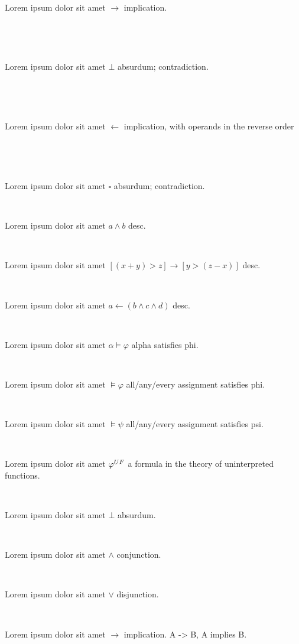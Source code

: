 \documentclass[12pt]{article}
\begin{document}
\centerline{~}

Lorem ipsum dolor sit amet $ \rightarrow $ implication.

\centerline{~}

\centerline{~}

Lorem ipsum dolor sit amet $ \bot $ absurdum; contradiction.

\centerline{~}

\centerline{~}

Lorem ipsum dolor sit amet $ \leftarrow  $ implication, with operands in the reverse order

\centerline{~}

\centerline{~}

Lorem ipsum dolor sit amet $ \square $ absurdum; contradiction.

\centerline{~}


Lorem ipsum dolor sit amet $ a \wedge b $ desc.

\centerline{~}


Lorem ipsum dolor sit amet $ [ ( x + y ) > z ] \rightarrow [ y > ( z - x ) ] $ desc.

\centerline{~}


Lorem ipsum dolor sit amet $ a \leftarrow ( b \wedge c \wedge d )  $ desc.

\centerline{~}

Lorem ipsum dolor sit amet $ \alpha \vDash \varphi $ alpha satisfies phi.

\centerline{~}

Lorem ipsum dolor sit amet $ \vDash \varphi $ all/any/every assignment satisfies phi.

\centerline{~}

Lorem ipsum dolor sit amet $ \vDash \psi $ all/any/every assignment satisfies psi.

\centerline{~}

Lorem ipsum dolor sit amet $ \varphi^{\scriptsize UF} $ a formula in the theory of uninterpreted functions.

\centerline{~}

Lorem ipsum dolor sit amet $ \bot $ absurdum.

\centerline{~}

Lorem ipsum dolor sit amet $ \wedge $ conjunction.

\centerline{~}

Lorem ipsum dolor sit amet $ \vee $ disjunction.

\centerline{~}

Lorem ipsum dolor sit amet $ \rightarrow $ implication.  A -> B,  A implies B.
\end{document}
